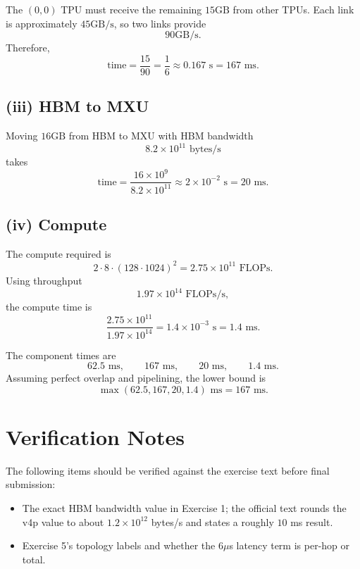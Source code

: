 \documentclass[11pt]{article}
\begin{document}
The $(0,0)$ TPU must receive the remaining $15 \mathrm{GB}$ from other TPUs. Each link is approximately $45 \mathrm{GB/s}$, so two links provide
\[
90 \mathrm{GB/s}.
\]
Therefore,
\[
\text{time}
  =
  \frac{15}{90}
  =
  \frac{1}{6}
  \approx
  0.167\text{ s}
  =
  167\text{ ms}.
\]

\subsection*{(iii) HBM to MXU}

Moving $16 \mathrm{GB}$ from HBM to MXU with HBM bandwidth
\[
8.2 \times 10^{11} \text{ bytes/s}
\]
takes
\[
\text{time}
  =
  \frac{16 \times 10^9}{8.2 \times 10^{11}}
  \approx
  2 \times 10^{-2}\text{ s}
  =
  20\text{ ms}.
\]

\subsection*{(iv) Compute}

The compute required is
\[
2 \cdot 8 \cdot (128 \cdot 1024)^2
  =
  2.75 \times 10^{11}\text{ FLOPs}.
\]
Using throughput
\[
1.97 \times 10^{14}\text{ FLOPs/s},
\]
the compute time is
\[
\frac{2.75 \times 10^{11}}{1.97 \times 10^{14}}
  =
  1.4 \times 10^{-3}\text{ s}
  =
  1.4\text{ ms}.
\]

The component times are
\[
62.5\text{ ms}, \qquad
167\text{ ms}, \qquad
20\text{ ms}, \qquad
1.4\text{ ms}.
\]
Assuming perfect overlap and pipelining, the lower bound is
\[
\max(62.5, 167, 20, 1.4)\text{ ms}
  =
  167\text{ ms}.
\]

\section*{Verification Notes}

The following items should be verified against the exercise text before final submission:
\begin{itemize}
  \item The exact HBM bandwidth value in Exercise 1; the official text rounds the v4p value to about $1.2 \times 10^{12}$ bytes/s and states a roughly $10$ ms result.
  \item Exercise 5's topology labels and whether the $6\mu$s latency term is per-hop or total.
\end{itemize}
\end{document}
